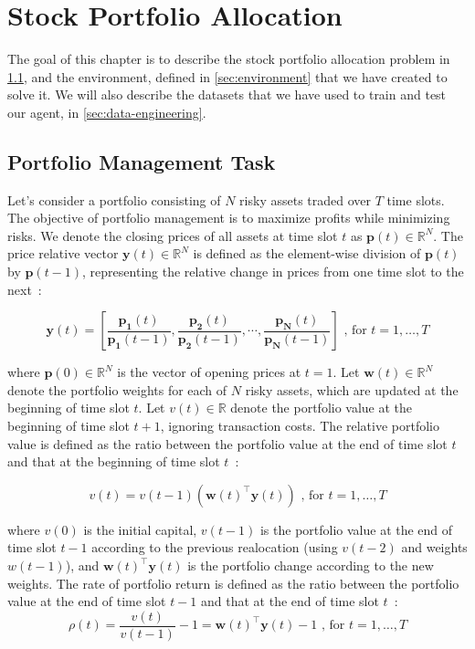 \documentclass[../xlapes02]{subfiles}
\begin{document}
    \chapter{Stock Portfolio Allocation}\label{sec:stock-portfolio-allocation}
    The goal of this chapter is to describe the stock portfolio allocation problem in \cref{sec:portfolio-management-task}, and the environment, defined in \cref{sec:environment} that we have created to solve it. We will also describe the datasets that we have used to train and test our agent, in \cref{sec:data-engineering}.


    \section{Portfolio Management Task}\label{sec:portfolio-management-task}
    Let's consider a portfolio consisting of $N$ risky assets traded over $T$ time slots. The objective of portfolio management is to maximize profits while minimizing risks. We denote the closing prices of all assets at time slot $t$ as $\mathbf{p}(t) \in \mathbb{R}^N$. The price relative vector $\mathbf{y}(t) \in \mathbb{R}^N$ is defined as the element-wise division of $\mathbf{p}(t)$ by $\mathbf{p}(t-1)$, representing the relative change in prices from one time slot to the next~\cite{finrl-portfolio-allocation-2020}:

    \begin{equation}
        \mathbf{y}(t)=\left[\frac{\mathbf{p_1}(t)}{\mathbf{p_1}(t-1)}, \frac{\mathbf{p_2}(t)}{\mathbf{p_2}(t-1)}, \cdots, \frac{\mathbf{p_N}(t)}{\mathbf{p_N}(t-1)}\right]\text{ , for }t=1,\ldots,T
    \end{equation}

    where $\mathbf{p}(0) \in \mathbb{R}^N$ is the vector of opening prices at $t = 1$. Let $\mathbf{w}(t) \in \mathbb{R}^N$ denote the portfolio weights for each of $N$ risky assets, which are updated at the beginning of time slot $t$. Let $v(t) \in \mathbb{R}$ denote the portfolio value at the beginning of time slot $t+1$, ignoring transaction costs. The relative portfolio value is defined as the ratio between the portfolio value at the end of time slot $t$ and that at the beginning of time slot $t$~\cite{finrl-portfolio-allocation-2020}:

    \begin{equation}
        v(t)=v(t-1)(\mathbf{w}(t)^\top\mathbf{y}(t))\text{ , for }t=1,\ldots,T
    \end{equation}

    where $v(0)$ is the initial capital, $v(t-1)$ is the portfolio value at the end of time slot $t-1$ according to the previous realocation (using $v(t-2)$ and weights $w(t-1)$), and $\mathbf{w}(t)^\top\mathbf{y}(t)$ is the portfolio change according to the new weights. The rate of portfolio return is defined as the ratio between the portfolio value at the end of time slot $t-1$ and that at the end of time slot $t$~\cite{finrl-portfolio-allocation-2020}:
    \begin{equation}
        \rho(t)=\frac{v(t)}{v(t-1)}-1=\mathbf{w}(t)^\top\mathbf{y}(t)-1\text{ , for }t=1,\ldots,T
    \end{equation}
\end{document}
